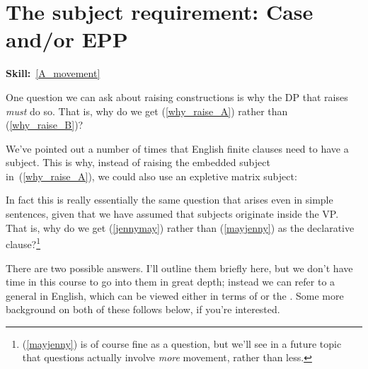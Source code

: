 \documentclass{article}
\begin{document}
\section{The subject requirement: Case and/or EPP}
\hfill{}\textbf{Skill:}~\ref{A_movement}

One question we can ask about raising constructions is why the DP that raises \emph{must} do so.
That is, why do we get (\ref{why_raise_A}) rather than (\ref{why_raise_B})?
\begin{exe}
    \label{why_raise}
\end{exe}

We've pointed out a number of times that English finite clauses need to have a subject. This is why, instead of raising the embedded subject in~(\ref{why_raise_A}), we could also use an expletive matrix subject:
\z

In fact this is really essentially the same question that arises even in simple sentences, given that we have assumed that subjects originate inside the VP.
That is, why do we get (\ref{jennymay}) rather than (\ref{mayjenny}) as the declarative clause?\footnote{(\ref{mayjenny}) is of course fine as a question, but we'll see in a future topic that questions actually involve \emph{more} movement, rather than less.}
\begin{exe}
\end{exe}
There are two possible answers.
I'll outline them briefly here, but we don't have time in this course to go into them in great depth; instead we can refer to a general  in English, which can be viewed either in terms of  or the . Some more background on both of these follows below, if you're interested.
\end{document}
